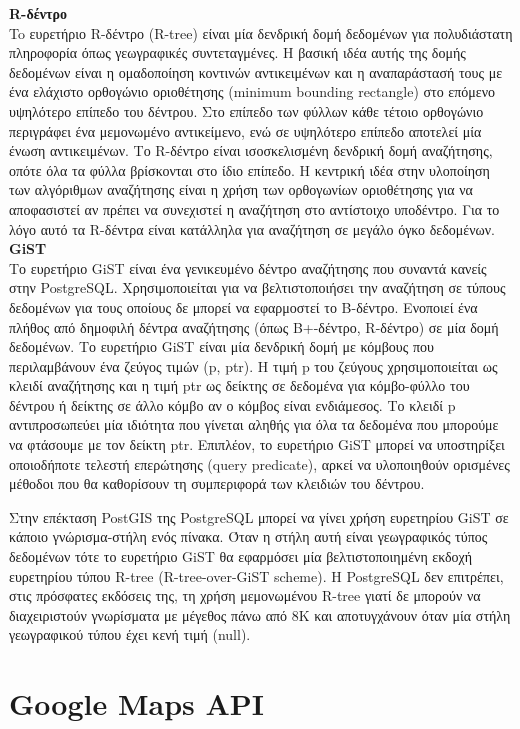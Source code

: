 \documentclass[diploma]{softlab-thesis}
\begin{document}
\textbf{R-δέντρο}\\

To ευρετήριο R-δέντρο (R-tree) είναι μία δενδρική δομή δεδομένων για πολυδιάστατη πληροφορία όπως γεωγραφικές συντεταγμένες. Η βασική ιδέα αυτής της δομής δεδομένων είναι η 
ομαδοποίηση κοντινών αντικειμένων και η αναπαράστασή τους με ένα ελάχιστο ορθογώνιο οριοθέτησης (minimum bounding rectangle) στο επόμενο υψηλότερο επίπεδο του δέντρου. 
Στο επίπεδο των φύλλων κάθε τέτοιο ορθογώνιο περιγράφει ένα μεμονωμένο αντικείμενο, ενώ σε υψηλότερο επίπεδο αποτελεί μία ένωση αντικειμένων. Το R-δέντρο είναι 
ισοσκελισμένη δενδρική δομή αναζήτησης, οπότε όλα τα φύλλα βρίσκονται στο ίδιο επίπεδο. Η κεντρική ιδέα στην υλοποίηση των αλγόριθμων αναζήτησης είναι η χρήση των 
ορθογωνίων οριοθέτησης για να αποφασιστεί αν πρέπει να συνεχιστεί η αναζήτηση στο αντίστοιχο υποδέντρο. Για το λόγο αυτό τα R-δέντρα είναι κατάλληλα για αναζήτηση σε μεγάλο όγκο 
δεδομένων. \\

\textbf{GiST}\\

Το ευρετήριο GiST είναι ένα γενικευμένο δέντρο αναζήτησης που συναντά κανείς στην PostgreSQL. Χρησιμοποιείται για να βελτιστοποιήσει την αναζήτηση σε τύπους δεδομένων 
για τους οποίους δε μπορεί να 
εφαρμοστεί το Β-δέντρο. Ενοποιεί ένα πλήθος από δημοφιλή δέντρα αναζήτησης (όπως B+-δέντρο, R-δέντρο) σε μία δομή δεδομένων. Το ευρετήριο GiST 
είναι μία δενδρική δομή με κόμβους που περιλαμβάνουν ένα ζεύγος τιμών (p, ptr). Η τιμή p του ζεύγους χρησιμοποιείται ως κλειδί αναζήτησης και η τιμή ptr ως δείκτης σε 
δεδομένα για κόμβο-φύλλο του δέντρου ή δείκτης σε άλλο κόμβο αν ο κόμβος είναι ενδιάμεσος. Το κλειδί p αντιπροσωπεύει μία ιδιότητα που γίνεται αληθής για όλα τα 
δεδομένα που μπορούμε να φτάσουμε με τον δείκτη ptr. Επιπλέον, το ευρετήριο GiST μπορεί να υποστηρίξει οποιοδήποτε 
τελεστή επερώτησης (query predicate), αρκεί να υλοποιηθούν ορισμένες μέθοδοι που θα καθορίσουν τη συμπεριφορά των κλειδιών του δέντρου.

Στην επέκταση PostGIS της PostgreSQL μπορεί να γίνει χρήση ευρετηρίου GiST σε κάποιο γνώρισμα-στήλη ενός πίνακα. Όταν η στήλη αυτή είναι γεωγραφικός τύπος δεδομένων τότε 
το ευρετήριο GiST θα εφαρμόσει μία βελτιστοποιημένη εκδοχή ευρετηρίου τύπου R-tree (R-tree-over-GiST scheme). H PostgreSQL δεν επιτρέπει, στις πρόσφατες εκδόσεις της, 
τη χρήση μεμονωμένου R-tree γιατί δε μπορούν να διαχειριστούν γνωρίσματα με μέγεθος πάνω από 8Κ και αποτυγχάνουν όταν μία στήλη γεωγραφικού τύπου έχει κενή τιμή (null).

\section{Google Maps API}



\end{document}
